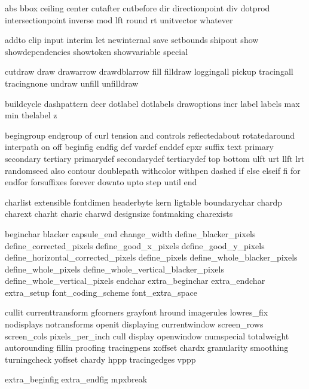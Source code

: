 \useprettyidentifiers \MPvariables \MPsetspecials
  abs bbox ceiling center cutafter cutbefore dir 
  directionpoint div dotprod intersectionpoint inverse mod lft
  round rt unitvector whatever 


\useprettyidentifiers \MPidentifiers \MPsetspecials
  addto clip input interim let newinternal save setbounds 
  shipout show showdependencies showtoken showvariable 
  special 

\useprettyidentifiers \MPvariables \MPsetspecials
  cutdraw draw drawarrow drawdblarrow fill filldraw 
  loggingall pickup tracingall tracingnone undraw unfill 
  unfilldraw 


\useprettyidentifiers \MPvariables \MPsetspecials
  buildcycle dashpattern decr dotlabel dotlabels drawoptions
  incr label labels max min thelabel z


\useprettyidentifiers \MPidentifiers \MPsetspecials
  begingroup endgroup of curl tension and controls 
  reflectedabout rotatedaround interpath on off beginfig 
  endfig def vardef enddef epxr suffix text primary secondary 
  tertiary primarydef secondarydef tertiarydef top bottom 
  ulft urt llft lrt randomseed also contour doublepath 
  withcolor withpen dashed if else elseif fi for endfor 
  forsuffixes forever downto upto step until end


\useprettyidentifiers \MPidentifiers \MPsetspecials
  charlist extensible fontdimen headerbyte kern ligtable 
  boundarychar chardp charext charht charic charwd designsize 
  fontmaking charexists 

\useprettyidentifiers \MPvariables \MPsetspecials
  beginchar blacker capsule_end change_width 
  define_blacker_pixels define_corrected_pixels 
  define_good_x_pixels define_good_y_pixels 
  define_horizontal_corrected_pixels define_pixels 
  define_whole_blacker_pixels define_whole_pixels 
  define_whole_vertical_blacker_pixels 
  define_whole_vertical_pixels endchar extra_beginchar 
  extra_endchar extra_setup font_coding_scheme 
  font_extra_space 


\useprettyidentifiers \MPidentifiers \MPsetspecials
  cullit currenttransform gfcorners grayfont hround 
  imagerules lowres_fix nodisplays notransforms openit 
  displaying currentwindow screen_rows screen_cols 
  pixels_per_inch cull display openwindow numspecial 
  totalweight autorounding fillin proofing tracingpens 
  xoffset chardx granularity smoothing turningcheck yoffset 
  chardy hppp tracingedges vppp


\useprettyidentifiers \MPidentifiers \MPsetspecials
  extra_beginfig extra_endfig mpxbreak 

\protect 

\endinput 
